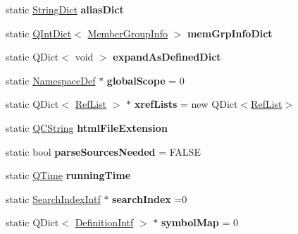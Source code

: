 \begin{DoxyCompactItemize}
\mbox{\label{class_doxygen_a2699fd682e95cf491bcd66624be0aa0b}} 
static \mbox{\hyperlink{class_string_dict}{String\+Dict}} {\bfseries alias\+Dict}
\item 
\mbox{\label{class_doxygen_af1fc60f2ca0c90aabbbd1184bf0c05d3}} 
static \mbox{\hyperlink{class_q_int_dict}{Q\+Int\+Dict}}$<$ \mbox{\hyperlink{struct_member_group_info}{Member\+Group\+Info}} $>$ {\bfseries mem\+Grp\+Info\+Dict}
\item 
\mbox{\label{class_doxygen_a396feff53760d374441739ec6a5f002a}} 
static Q\+Dict$<$ void $>$ {\bfseries expand\+As\+Defined\+Dict}
\item 
\mbox{\label{class_doxygen_a24ab2a65644e423b09020f9e63d250bd}} 
static \mbox{\hyperlink{class_namespace_def}{Namespace\+Def}} $\ast$ {\bfseries global\+Scope} = 0
\item 
\mbox{\label{class_doxygen_a645b82fe7debf260fbedd01c59e3bb87}} 
static Q\+Dict$<$ \mbox{\hyperlink{class_ref_list}{Ref\+List}} $>$ $\ast$ {\bfseries xref\+Lists} = new Q\+Dict$<$\mbox{\hyperlink{class_ref_list}{Ref\+List}}$>$
\item 
\mbox{\label{class_doxygen_aa98afe79970170f82848bc45b0f076ec}} 
static \mbox{\hyperlink{class_q_c_string}{Q\+C\+String}} {\bfseries html\+File\+Extension}
\item 
\mbox{\label{class_doxygen_a19687ee2473747b1c587aa6c033daa6c}} 
static bool {\bfseries parse\+Sources\+Needed} = F\+A\+L\+SE
\item 
\mbox{\label{class_doxygen_a1a243328345698e4fef76a5b6d4db5ee}} 
static \mbox{\hyperlink{class_q_time}{Q\+Time}} {\bfseries running\+Time}
\item 
\mbox{\label{class_doxygen_a806fe73b71f926356bf12291778769b6}} 
static \mbox{\hyperlink{class_search_index_intf}{Search\+Index\+Intf}} $\ast$ {\bfseries search\+Index} =0
\item 
\mbox{\label{class_doxygen_a089679b41a1b70f299d653312097f879}} 
static Q\+Dict$<$ \mbox{\hyperlink{class_definition_intf}{Definition\+Intf}} $>$ $\ast$ {\bfseries symbol\+Map} = 0

\end{DoxyCompactItemize}
